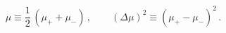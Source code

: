 \begin{equation}\mu\equiv \frac{1}{2}\,(\mu_++\mu_-)\,, \qquad
(\Delta\mu)^2\equiv (\mu_+-\mu_-)^2\,.\end{equation}

